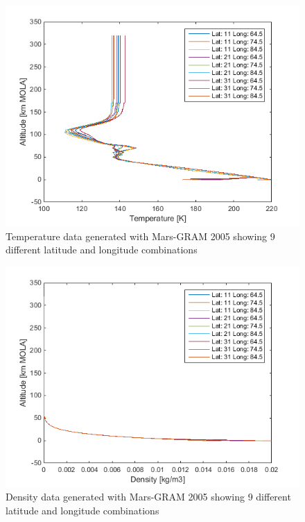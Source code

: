 \begin{figure}[!ht]
\centering
\includegraphics[width=1.0\textwidth]{figures/software/temperatureData.png}
\caption{Temperature data generated with Mars-\ac{GRAM} 2005 showing 9 different latitude and longitude combinations}
\label{fig:temperatureData}
\end{figure}

\begin{figure}[!ht]
\centering
\includegraphics[width=1.0\textwidth]{figures/software/densityData.png}
\caption{Density data generated with Mars-\ac{GRAM} 2005 showing 9 different latitude and longitude combinations}
\label{fig:densityData}
\end{figure}

